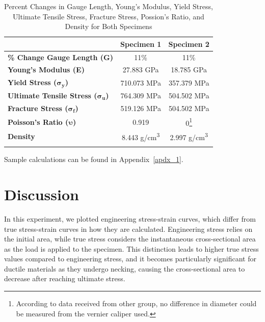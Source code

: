 \documentclass[conference, letterpaper]{IEEEtran}
\begin{document}
    \vspace*{-\baselineskip}
    \begin{table}[htbp]
        \caption{Percent Changes in Gauge Length, Young's Modulus, Yield Stress, Ultimate Tensile Stress, Fracture Stress, Possion's Ratio, and Density for Both Specimens}
        \begin{minipage}{\linewidth}
            \centering
            \begin{tabular}{lcc}
                \toprule{}
                & \textbf{Specimen 1} & \textbf{Specimen 2} \\
                \midrule{}
                \hspace*{-1ex}\textbf{\% Change Gauge Length (G)} & 11\% & 11\% \\
                \textbf{Young's Modulus (E)} & 27.883 GPa & 18.785 GPa \\
                \textbf{Yield Stress (\(\bm{\sigma_y}\))} & 710.073 MPa & 357.379 MPa \\
                \textbf{Ultimate Tensile Stress (\(\bm{\sigma_u}\))} & 764.309 MPa & 504.502 MPa\\
                \textbf{Fracture Stress (\(\bm{\sigma_f}\))} & 519.126 MPa & 504.502 MPa \\
                \textbf{Poisson's Ratio (\(\bm{\upsilon}\))} & 0.919 & 0\footnote{According to data received from other group, no difference in diameter could be measured from the vernier caliper used.} \\
                \textbf{Density} & 8.443 g/cm\textsuperscript{3} & 2.997 g/cm\textsuperscript{3} \\
                \bottomrule{}
            \end{tabular}\label{tbl_1}
            \vspace*{-\baselineskip}
        \end{minipage}
    \end{table}
    Sample calculations can be found in Appendix\ \ref{apdx_1}.

\section{Discussion}
    In this experiment, we plotted engineering stress-strain curves, which differ from true stress-strain curves in how they are calculated. 
    Engineering stress relies on the initial area, while true stress considers the instantaneous cross-sectional area as the load is applied to the specimen. 
    This distinction leads to higher true stress values compared to engineering stress, and it becomes particularly significant for ductile materials as they undergo necking, causing the cross-sectional area to decrease after reaching ultimate stress.
\end{document}

